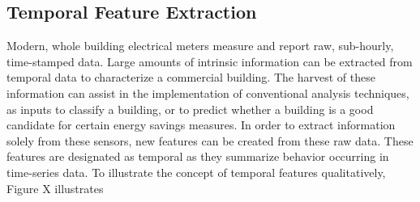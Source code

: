 \subsection{Temporal Feature Extraction}
Modern, whole building electrical meters measure and report raw, sub-hourly, time-stamped data. Large amounts of intrinsic information can be extracted from temporal data to characterize a commercial building. The harvest of these information can assist in the implementation of conventional analysis techniques, as inputs to classify a building, or to predict whether a building is a good candidate for certain energy savings measures. In order to extract information solely from these sensors, new features can be created from these raw data. These features are designated as temporal as they summarize behavior occurring in time-series data. To illustrate the concept of temporal features qualitatively, Figure X illustrates
